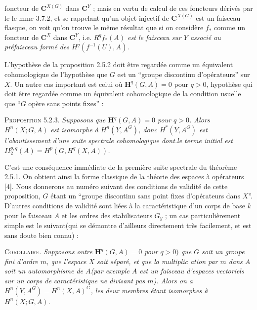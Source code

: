 \clearpage
{}

\noindent foncteur de ${\mathbf C}^{X(G)}$ dans ${\mathbf C}^Y$ ; mais en vertu de calcul de ces
foncteurs dérivés par le le mme 3.7.2, et se rappelant qu'un objet injectif de
${\mathbf C}^{X(G)}$ est un faisceau flasque, on voit qu'on trouve le même résultat que
si on considère $f_*$ comme un foncteur de ${\mathbf C}^X$ dans ${\mathbf C}^Y$, i.e.
\textit{$R^qf_*(A)$ est le faisceau sur $Y$ associé au préfaisceau formé des
$H^q(f^{-1}(U),A)$.}

L'hypothèse de la proposition 2.5.2 doit être regardée comme un équivalent
cohomologique de l'hypothèse que $G$ est un ``groupe discontinu d'opérateurs''
sur $X$. Un autre cas important est celui oû $\mathbf H^q(G,A)=0$ pour $q>0$,
hypothèse qui doit être regardée comme un équivalent cohomologique de la
condition usuelle que ``$G$ opère sans points fixes'' :

\textsc{Proposition 5.2.3.} \textit{Supposons que
$\mathbf H^q(G,A)=0$ pour $q>0$. Alors $H^n(X;G,A)$ est isomorphe à
$H^n(Y,A^G)$, donc $H^*(Y,A^G)$ est l'aboutissement d'une suite spectrale
cohomologique dont.le terme initial est
$II_2^{p,q}(A)=H^p(G,H^q(X,A))$.}

C'est une conséquence immédiate de la première suite spectrale du théorème
2.5.1.
On obtient ainsi la forme classique de la théorie des espaces à opérateurs
[4]. Nous donnerons au numéro suivant des conditions de validité de cette
proposition, $G$ étant un ``groupe discontinu sans point fixes d'opérateurs
dans $X$''. D'autres conditions de validité sont liées à la caractéristique
d'un corps de base $k$ pour le faisceau $A$ et les ordres des stabilisateurs
$G_y$ ; un cas particulièrement simple est le suivant(qui se démontre
d'ailleurs directement très facilement, et est sans doute bien connu) :

\textsc{Corollaire.} \textit{Supposons outre $\mathbf H^q(G,A)=0$
pour $q>0)$ que $G$ soit un groupe fini d'ordre $m$, que l'espace $X$ soit
séparé, et que la multiplic ation par $m$ dans $A$ soit un automorphisme de
$A$(par exemple $A$ est un faisceau d'espaces vectoriels sur un corps de
caractéristique ne divisant pas $m$). Alors on a
$H^n(Y,A^G)=H^n(X,A)^G$, les deux membres étant isomorphes à
$H^n(X;G,A)$.}


